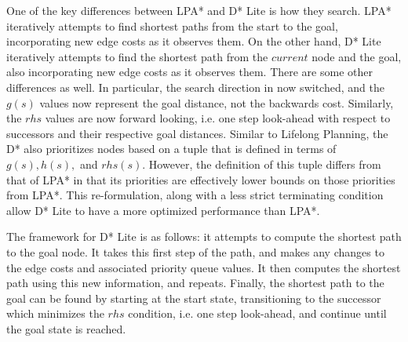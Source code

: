 	One of the key differences between LPA* and D* Lite is how they search. LPA* iteratively attempts to find shortest paths from the start to the goal, incorporating new edge costs as it observes them. On the other hand, D* Lite iteratively attempts to find the shortest path from the $current$ node and the goal, also incorporating new edge costs as it observes them. There are some other differences as well. In particular, the search direction in now switched, and the $g(s)$ values now represent the goal distance, not the backwards cost. Similarly, the $rhs$ values are now forward looking, i.e. one step look-ahead with respect to successors and their respective goal distances. Similar to Lifelong Planning, the D* also prioritizes nodes based on a tuple that is defined in terms of  $g(s),h(s),$ and $rhs(s)$. However, the definition of this tuple differs from that of LPA* in that its priorities are effectively lower bounds on those priorities from LPA*. This re-formulation, along with a less strict terminating condition allow D* Lite to have a more optimized performance than LPA*.  
	
	
	The framework for D* Lite is as follows: it attempts to compute the shortest path to the goal node. It takes this first step of the path, and makes any changes to the edge costs and associated priority queue values. It then computes the shortest path using this new information, and repeats. Finally, the shortest path to the goal can be found by starting at the start state, transitioning to the successor which minimizes the $rhs$ condition, i.e. one step look-ahead, and continue until the goal state is reached. 